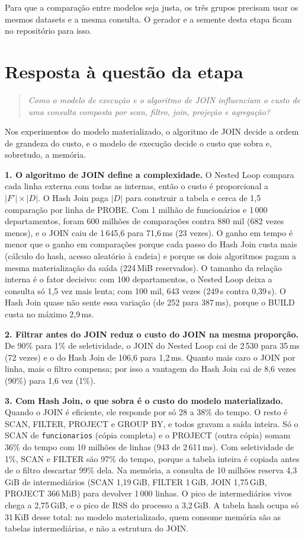 \documentclass[11pt,a4paper]{article}
\begin{document}
Para que a comparação entre modelos seja justa, os três grupos precisam usar os mesmos datasets e a mesma consulta. O gerador e a semente desta etapa ficam no repositório para isso.

\section{Resposta à questão da etapa}\label{sec:questao}
\begin{quote}
\emph{Como o modelo de execução e o algoritmo de JOIN influenciam o custo de uma consulta composta por scan, filtro, join, projeção e agregação?}
\end{quote}

Nos experimentos do modelo materializado, o algoritmo de JOIN decide a ordem de grandeza do custo, e o modelo de execução decide o custo que sobra e, sobretudo, a memória.

\textbf{1. O algoritmo de JOIN define a complexidade.} O Nested Loop compara cada linha externa com todas as internas, então o custo é proporcional a $|F'| \times |D|$. O Hash Join paga $|D|$ para construir a tabela e cerca de 1,5 comparação por linha de PROBE. Com 1 milhão de funcionários e 1\,000 departamentos, foram 600 milhões de comparações contra 880 mil (682 vezes menos), e o JOIN caiu de 1\,645,6 para 71,6\,ms (23 vezes). O ganho em tempo é menor que o ganho em comparações porque cada passo do Hash Join custa mais (cálculo do hash, acesso aleatório à cadeia) e porque os dois algoritmos pagam a mesma materialização da saída (224\,MiB reservados). O tamanho da relação interna é o fator decisivo: com 100 departamentos, o Nested Loop deixa a consulta só 1,5 vez mais lenta; com 100 mil, 643 vezes (249\,s contra 0,39\,s). O Hash Join quase não sente essa variação (de 252 para 387\,ms), porque o BUILD custa no máximo 2,9\,ms.

\textbf{2. Filtrar antes do JOIN reduz o custo do JOIN na mesma proporção.} De 90\% para 1\% de seletividade, o JOIN do Nested Loop cai de 2\,530 para 35\,ms (72 vezes) e o do Hash Join de 106,6 para 1,2\,ms. Quanto mais caro o JOIN por linha, mais o filtro compensa; por isso a vantagem do Hash Join cai de 8,6 vezes (90\%) para 1,6 vez (1\%).

\textbf{3. Com Hash Join, o que sobra é o custo do modelo materializado.} Quando o JOIN é eficiente, ele responde por só 28 a 38\% do tempo. O resto é SCAN, FILTER, PROJECT e GROUP BY, e todos gravam a saída inteira. Só o SCAN de \texttt{funcionarios} (cópia completa) e o PROJECT (outra cópia) somam 36\% do tempo com 10 milhões de linhas (943 de 2\,611\,ms). Com seletividade de 1\%, SCAN e FILTER são 97\% do tempo, porque a tabela inteira é copiada antes de o filtro descartar 99\% dela. Na memória, a consulta de 10 milhões reserva 4,3\,GiB de intermediários (SCAN 1,19\,GiB, FILTER 1\,GiB, JOIN 1,75\,GiB, PROJECT 366\,MiB) para devolver 1\,000 linhas. O pico de intermediários vivos chega a 2,75\,GiB, e o pico de RSS do processo a 3,2\,GiB. A tabela hash ocupa só 31\,KiB desse total: no modelo materializado, quem consome memória são as tabelas intermediárias, e não a estrutura do JOIN.
\end{document}
